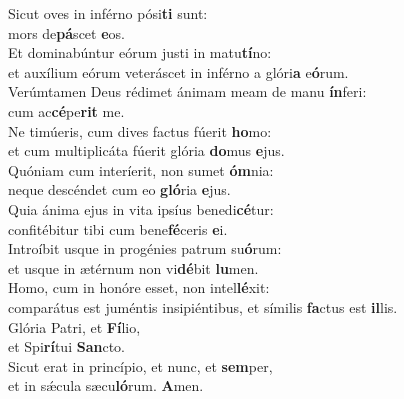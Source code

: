 \evenverse Sicut oves in inférno pósi\textbf{ti} sunt:~\*\\
\evenverse mors de\textbf{pá}scet \textbf{e}os.\\
\oddverse Et dominabúntur eórum justi in matu\textbf{tí}no:~\*\\
\oddverse et auxílium eórum veteráscet in inférno a glóri\textbf{a} e\textbf{ó}rum.\\
\evenverse Verúmtamen Deus rédimet ánimam meam de manu \textbf{ín}feri:~\*\\
\evenverse cum ac\textbf{cé}pe\textbf{rit} me.\\
\oddverse Ne timúeris, cum dives factus fúerit \textbf{ho}mo:~\*\\
\oddverse et cum multiplicáta fúerit glória \textbf{do}mus \textbf{e}jus.\\
\evenverse Quóniam cum interíerit, non sumet \textbf{óm}nia:~\*\\
\evenverse neque descéndet cum eo \textbf{gló}ria \textbf{e}jus.\\
\oddverse Quia ánima ejus in vita ipsíus benedi\textbf{cé}tur:~\*\\
\oddverse confitébitur tibi cum bene\textbf{fé}ceris \textbf{e}i.\\
\evenverse Introíbit usque in progénies patrum su\textbf{ó}rum:~\*\\
\evenverse et usque in ætérnum non vi\textbf{dé}bit \textbf{lu}men.\\
\oddverse Homo, cum in honóre esset, non intel\textbf{lé}xit:~\*\\
\oddverse comparátus est juméntis insipiéntibus, et símilis \textbf{fa}ctus est \textbf{il}lis.\\
\evenverse Glória Patri, et \textbf{Fí}lio,~\*\\
\evenverse et Spi\textbf{rí}tui \textbf{San}cto.\\
\oddverse Sicut erat in princípio, et nunc, et \textbf{sem}per,~\*\\
\oddverse et in sǽcula sæcu\textbf{ló}rum. \textbf{A}men.\\
